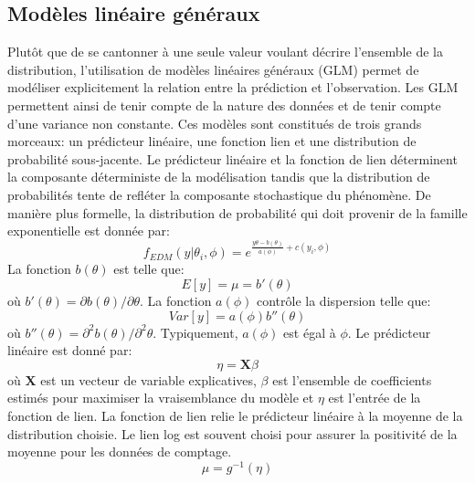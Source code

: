     \subsection{Modèles linéaire généraux}
        Plutôt que de se cantonner à une seule valeur voulant décrire l'ensemble de la distribution, l'utilisation de modèles linéaires généraux (GLM) \parencite{nelder_generalized_1972,cameron_regression_1998} permet de modéliser explicitement la relation entre la prédiction et l'observation. Les GLM permettent ainsi de tenir compte de la nature des données et de tenir compte d'une variance non constante. Ces modèles sont constitués de trois grands morceaux: un prédicteur linéaire, une fonction lien et une distribution de probabilité sous-jacente. Le prédicteur linéaire et la fonction de lien déterminent la composante déterministe de la modélisation tandis que la distribution de probabilités tente de refléter la composante stochastique du phénomène. De manière plus formelle, la distribution de probabilité qui doit provenir de la famille exponentielle est donnée par:
        \begin{equation}
            f_{EDM}(y|\theta_i, \phi) =  e^{\frac{y\theta-b(\theta)}{a(\phi)}+c(y_i,\phi)}
        \end{equation}
        La fonction $b(\theta)$ est telle que:
        \begin{equation}
            E[y] =\mu= b'(\theta)
        \end{equation}
        où $b'(\theta) = \partial b(\theta) /\partial\theta$. La fonction $a(\phi)$ contrôle la dispersion telle que: 
        \begin{equation}
            Var[y] = a(\phi)b''(\theta)
        \end{equation}
        où $b''(\theta) = \partial^2 b(\theta) /\partial^2\theta$. Typiquement, $a(\phi)$ est égal à $\phi$. Le prédicteur linéaire est donné par:
        \begin{equation}
            \eta = \mathbf{X}\beta
        \end{equation}
        où $\mathbf{X}$ est un vecteur de variable explicatives, $\beta$ est l'ensemble de coefficients estimés pour maximiser la vraisemblance du modèle et $\eta$ est l'entrée de la fonction de lien. La fonction de lien relie le prédicteur linéaire à la moyenne de la distribution choisie. Le lien log est souvent choisi pour assurer la positivité de la moyenne pour les données de comptage.
        \begin{equation}
            \mu = g^{-1}(\eta)
        \end{equation}
